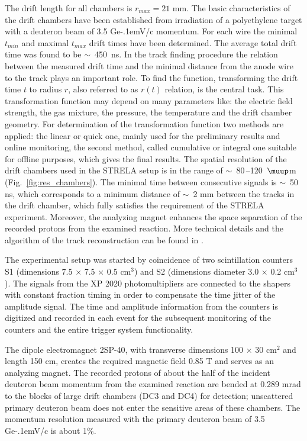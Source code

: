 \documentclass[twocolumn,epjc3]{svjour3}
\newcommand{\GeVc}   {Ge\kern-.1emV/c\xspace}
\begin{document}
The drift length for all chambers is $r_{max} = 21$ mm. The basic
characteristics of the drift chambers have been established from irradiation of
a polyethylene target with a deuteron beam of 3.5 \GeVc momentum. For each wire
the minimal $t_{min}$ and maximal $t_{max}$ drift times have been
determined. The average total drift time was found to be $\sim$~450~ns. In the
track finding procedure the relation between the measured drift time and the
minimal distance from the anode wire to the track plays an important role. To
find the function, transforming the drift time $t$ to radius $r$, also referred
to as $r(t)$ relation, is the central task. This transformation function may
depend on many parameters like: the electric field strength, the gas mixture,
the pressure, the temperature and the drift chamber geometry. For determination
of the transformation function two methods are applied: the linear or quick one,
mainly used for the preliminary results and online monitoring, the second
method, called cumulative or integral one suitable for offline purposes, which
gives the final results. The spatial resolution of the drift chambers used in
the STRELA setup is in the range of $\sim$~80\,--120~$\muup$m
(Fig.~\ref{fig:res_chambers}). The minimal time between consecutive signals is
$\sim$~50 ns, which corresponds to a minimum distance of $\sim$~2 mm between the
tracks in the drift chamber, which fully satisfies the requirement of the STRELA
experiment. Moreover, the analyzing magnet enhances the space separation of the
recorded protons from the examined reaction. More technical details and the
algorithm of the track reconstruction can be found in \cite{gla13}.

The experimental setup was started by coincidence of two scintillation counters
S1 (dimensions 7.5 $\times$ 7.5 $\times$ 0.5 cm$^3$) and S2 (dimensions diameter
3.0 $\times$ 0.2 cm$^3$). The signals from the XP 2020 photomultipliers are
connected to the shapers with constant fraction timing in order to compensate
the time jitter of the amplitude signal. The time and amplitude information from
the counters is digitized and recorded in each event for the subsequent
monitoring of the counters and the entire trigger system functionality.

The dipole electromagnet 2SP-40, with transverse dimensions 100 $\times$ 30
cm$^2$ and length 150 cm, creates the required magnetic field 0.85 T and serves
as an analyzing magnet. The recorded protons of about the half of the incident
deuteron beam momentum from the examined reaction are bended at 0.289 mrad to
the blocks of large drift chambers (DC3 and DC4) for detection; unscattered
primary deuteron beam does not enter the sensitive areas of these chambers. The
momentum resolution measured with the primary deuteron beam of 3.5 \GeVc is
about 1\%.
\end{document}
